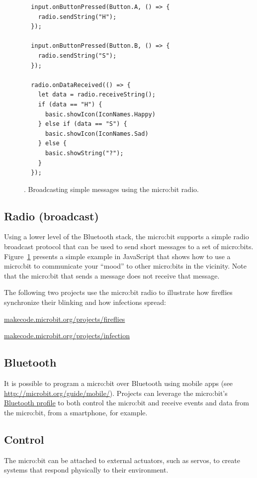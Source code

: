 \begin{figure}[t]
\begin{verbatim}
  input.onButtonPressed(Button.A, () => {
    radio.sendString("H");
  });

  input.onButtonPressed(Button.B, () => {
    radio.sendString("S");
  });

  radio.onDataReceived(() => {
    let data = radio.receiveString();
    if (data == "H") {
      basic.showIcon(IconNames.Happy)
    } else if (data == "S") {
      basic.showIcon(IconNames.Sad)
    } else {
      basic.showString("?");
    }
  });
\end{verbatim}
\caption{\label{fig:mood}. Broadcasting simple messages using the micro:bit radio.}
\end{figure}

\subsection{Radio (broadcast)}

Using a lower level of the Bluetooth stack, the micro:bit supports 
a simple radio broadcast protocol that can be used to send short messages
to a set of micro:bits. Figure~\ref{fig:mood} presents a simple example 
in JavaScript that shows how to use a micro:bit to communicate your 
``mood'' to other micro:bits in the vicinity.
Note that the micro:bit that sends a message does not
receive that message. 

The following two projects use the micro:bit radio to illustrate
how fireflies synchronize their blinking and how infections spread:
\begin{center}    
    \small{\url{makecode.microbit.org/projects/fireflies}}
\end{center}
\begin{center}    
    \small{\url{makecode.microbit.org/projects/infection}}
\end{center}

\subsection{Bluetooth}

It is possible to program a micro:bit over Bluetooth using mobile apps
(see \url{http://microbit.org/guide/mobile/}). 
Projects can leverage the micro:bit's 
\href{https://lancaster-university.github.io/microbit-docs/ble/profile/}{Bluetooth profile} to 
both control the micro:bit and receive events and data
from the micro:bit, from a smartphone, for example.  

\subsection{Control}

The micro:bit can be attached to external actuators, such as servos,
to create systems that respond physically to their environment. 



